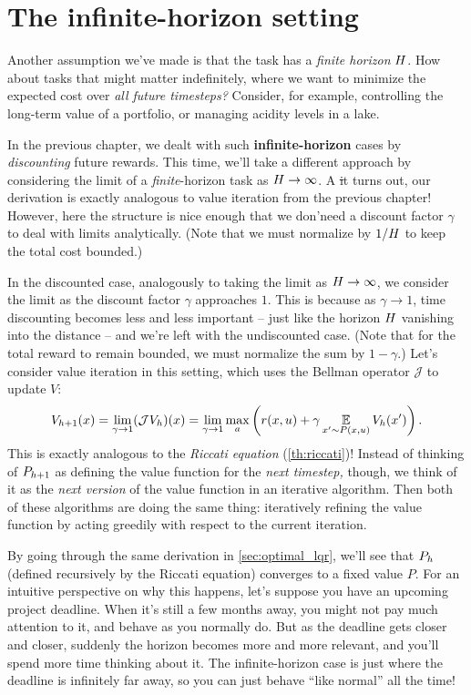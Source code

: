 \documentclass[../main/main]{subfiles}
\begin{document}
\section{The infinite-horizon setting}

Another assumption we've made is that the task has a \emph{finite horizon} $H$. How about tasks that might matter indefinitely, where we want to minimize the expected cost over \emph{all future timesteps?} Consider, for example, controlling the long-term value of a portfolio, or managing acidity levels in a lake.

In the previous chapter, we dealt with such \textbf{infinite-horizon} cases by \emph{discounting} future rewards. This time, we'll take a different approach by considering the limit of a \emph{finite}-horizon task as $H \to \infty$.
A \st it turns out, our derivation is exactly analogous to value iteration from the previous chapter! However, here the structure is nice enough that we don'\hi need a discount factor $\gamma$ to deal with limits analytically. (Note that we must normalize by $1/H$ to keep the total cost bounded.)

In the discounted case, analogously to taking the limit as $H \to \infty$, we consider the limit as the discount factor $\gamma$ approaches $1$. This is because as $\gamma \to 1$, time discounting becomes less and less important -- just like the horizon $H$ vanishing into the distance -- and we're left with the undiscounted case. (Note that for the total reward to remain bounded, we must normalize the sum by $1 - \gamma$.) Let's consider value iteration in this setting, which uses the Bellman operator $\mathcal{J}$ to update $V$: \[
    V_{h+1}(x) = \lim_{\gamma \to 1} (\mathcal{J} V_h)(x) = \lim_{\gamma \to 1} \max_a \left( r(x, u) + \gamma \operatorname*{\mathbb{E}}_{x' \sim P(x, u)} V_h(x') \right).
\]
This is exactly analogous to the \emph{Riccati equation} (\ref{th:riccati})!
Instead of thinking of $P_{h+1}$ as defining the value function for the \emph{next timestep,} though, we think of it as the \emph{next version} of the value function in an iterative algorithm.
Then both of these algorithms are doing the same thing:
iteratively refining the value function by acting greedily with respect to the current iteration.

By going through the same derivation in \autoref{sec:optimal_lqr}, we'll see that $P_h$ (defined recursively by the Riccati equation) converges to a fixed value $P$.
For an intuitive perspective on why this happens, let's suppose you have an upcoming project deadline. When it's still a few months away, you might not pay
much attention to it, and behave as you normally do. But as the deadline gets closer and closer, suddenly the
horizon becomes more and more relevant, and you'll spend more time thinking about it.
The infinite-horizon case is just where the deadline is infinitely far away, so you can just behave ``like normal'' all the time!
\end{document}
